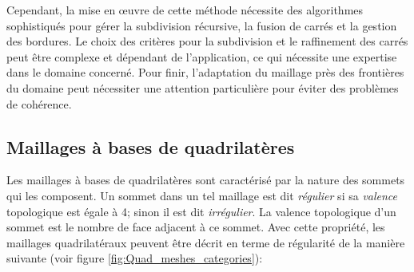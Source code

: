Cependant, la mise en œuvre de cette méthode nécessite des algorithmes sophistiqués pour gérer la subdivision récursive, la fusion de carrés et la gestion des bordures. Le choix des critères pour la subdivision et le raffinement des carrés peut être complexe et dépendant de l'application, ce qui nécessite une expertise dans le domaine concerné. Pour finir, l'adaptation du maillage près des frontières du domaine peut nécessiter une attention particulière pour éviter des problèmes de cohérence.


\subsection{Maillages à bases de quadrilatères}

Les maillages à bases de quadrilatères sont caractérisé par la nature des sommets qui les composent. Un sommet dans un tel maillage est dit \emph{régulier} si sa \emph{valence} topologique est égale à 4; sinon il est dit \emph{irrégulier}. La valence topologique d'un sommet est le nombre de face adjacent à ce sommet. Avec cette propriété, les maillages quadrilatéraux peuvent être décrit en terme de régularité de la manière suivante \cite{bommes2013quad} (voir figure \ref{fig:Quad_meshes_categories}):\\


